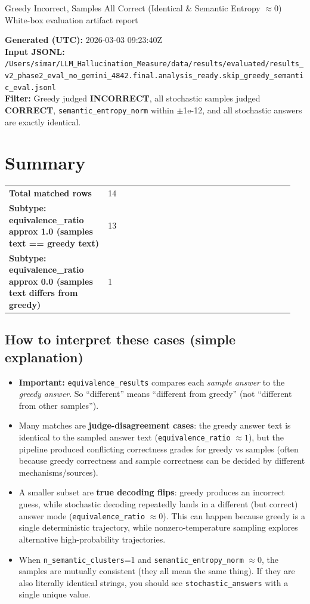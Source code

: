 \documentclass[11pt]{article}
\newcommand{\gradebad}[1]{\textcolor{red!70!black}{\textbf{#1}}}
\newcommand{\gradegood}[1]{\textcolor{green!50!black}{\textbf{#1}}}
\newcommand{\mono}[1]{\texttt{#1}}
\begin{document}
\begin{center}
{\LARGE Greedy Incorrect, Samples All Correct (Identical \& Semantic Entropy $\approx 0$)}\\[4pt]
{\large White-box evaluation artifact report}\\[6pt]
\end{center}
\textbf{Generated (UTC):} 2026-03-03 09:23:40Z\\
\textbf{Input JSONL:} \nolinkurl{/Users/simar/LLM_Hallucination_Measure/data/results/evaluated/results_v2_phase2_eval_no_gemini_4842.final.analysis_ready.skip_greedy_semantic_eval.jsonl}\\
\textbf{Filter:} Greedy judged \gradebad{INCORRECT}, all stochastic samples judged \gradegood{CORRECT}, \mono{semantic\_entropy\_norm} within $\pm$1e-12, and all stochastic answers are exactly identical.
\section*{Summary}
\begin{tabular}{@{}p{0.33\linewidth}p{0.62\linewidth}@{}}
\textbf{Total matched rows} & 14 \\
\textbf{Subtype: equivalence\_ratio approx 1.0 (samples text == greedy text)} & 13 \\
\textbf{Subtype: equivalence\_ratio approx 0.0 (samples text differs from greedy)} & 1 \\
\end{tabular}
\subsection*{How to interpret these cases (simple explanation)}\begin{itemize}\item \textbf{Important:} \mono{equivalence\_results} compares each \emph{sample answer} to the \emph{greedy answer}. So ``different'' means ``different from greedy'' (not ``different from other samples'').\item Many matches are \textbf{judge-disagreement cases}: the greedy answer text is identical to the sampled answer text (\mono{equivalence\_ratio} $\approx 1$), but the pipeline produced conflicting correctness grades for greedy vs samples (often because greedy correctness and sample correctness can be decided by different mechanisms/sources).\item A smaller subset are \textbf{true decoding flips}: greedy produces an incorrect guess, while stochastic decoding repeatedly lands in a different (but correct) answer mode (\mono{equivalence\_ratio} $\approx 0$). This can happen because greedy is a single deterministic trajectory, while nonzero-temperature sampling explores alternative high-probability trajectories.\item When \mono{n\_semantic\_clusters}=1 and \mono{semantic\_entropy\_norm} $\approx 0$, the samples are mutually consistent (they all mean the same thing). If they are also literally identical strings, you should see \mono{stochastic\_answers} with a single unique value.\end{itemize}
\end{document}
